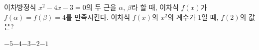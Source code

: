 이차방정식 $x^2-4x-3=0$의 두 근을 $\alpha$, $\beta$라 할 때, 이차식 $f(x)$가 $f(\alpha)=f(\beta)=4$를 만족시킨다. 이차식 $f(x)$의 $x^2$의 계수가 $1$일 때, $f(2)$의 값은?
\begin{choices32}{$-5$}{$-4$}{$-3$}{$-2$}{$-1$}\end{choices32}
